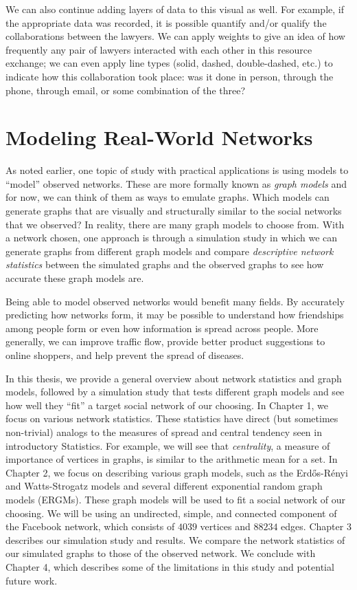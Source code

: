 \documentclass[12pt,twoside]{amherstthesis}
\begin{document}
  We can also continue adding layers of data to this visual as well. For
  example, if the appropriate data was recorded, it is possible quantify
  and/or qualify the collaborations between the lawyers. We can apply
  weights to give an idea of how frequently any pair of lawyers interacted
  with each other in this resource exchange; we can even apply line types
  (solid, dashed, double-dashed, etc.) to indicate how this collaboration
  took place: was it done in person, through the phone, through email, or
  some combination of the three?
  
  \section{Modeling Real-World
  Networks}\label{modeling-real-world-networks}
  
  As noted earlier, one topic of study with practical applications is
  using models to ``model'' observed networks. These are more formally
  known as \emph{graph models} and for now, we can think of them as ways
  to emulate graphs. Which models can generate graphs that are visually
  and structurally similar to the social networks that we observed? In
  reality, there are many graph models to choose from. With a network
  chosen, one approach is through a simulation study in which we can
  generate graphs from different graph models and compare
  \emph{descriptive network statistics} between the simulated graphs and
  the observed graphs to see how accurate these graph models are.
  
  Being able to model observed networks would benefit many fields. By
  accurately predicting how networks form, it may be possible to
  understand how friendships among people form or even how information is
  spread across people. More generally, we can improve traffic flow,
  provide better product suggestions to online shoppers, and help prevent
  the spread of diseases.
  
  In this thesis, we provide a general overview about network statistics
  and graph models, followed by a simulation study that tests different
  graph models and see how well they ``fit'' a target social network of
  our choosing. In Chapter 1, we focus on various network statistics.
  These statistics have direct (but sometimes non-trivial) analogs to the
  measures of spread and central tendency seen in introductory Statistics.
  For example, we will see that \emph{centrality}, a measure of importance
  of vertices in graphs, is similar to the arithmetic mean for a set. In
  Chapter 2, we focus on describing various graph models, such as the
  Erdős-Rényi and Watts-Strogatz models and several different exponential
  random graph models (ERGMs). These graph models will be used to fit a
  social network of our choosing. We will be using an undirected, simple,
  and connected component of the Facebook network, which consists of
  \(4039\) vertices and \(88234\) edges. Chapter 3 describes our
  simulation study and results. We compare the network statistics of our
  simulated graphs to those of the observed network. We conclude with
  Chapter 4, which describes some of the limitations in this study and
  potential future work.
  
\end{document}

